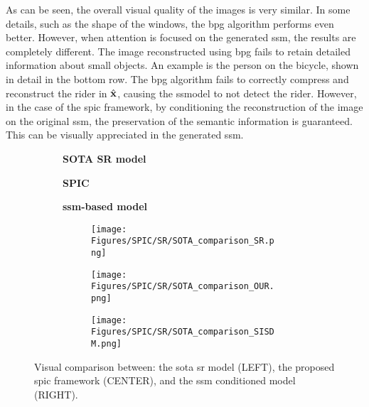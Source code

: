As can be seen, the overall visual quality of the images is very similar. In some details, such as the shape of the windows, the \gls{bpg} algorithm performs even better. However, when attention is focused on the generated \gls{ssm}, the results are completely different. The image reconstructed using \gls{bpg} fails to retain detailed information about small objects. An example is the person on the bicycle, shown in detail in the bottom row. The \gls{bpg} algorithm fails to correctly compress and reconstruct the rider in $\hat{\mathbf{x}}$, causing the \gls{ssmodel} to not detect the rider. However, in the case of the \gls{spic} framework, by conditioning the reconstruction of the image on the original \gls{ssm}, the preservation of the semantic information is guaranteed. This can be visually appreciated in the generated \gls{ssm}.
\begin{figure}[!t]
    \centering
    \begin{subfigure}{\textwidth}
        \centering
        \begin{minipage}{0.333\textwidth}
            \centering
            \textbf{SOTA SR model} \cite{Rombach2022SR_CVPR}
        \end{minipage}%
        \begin{minipage}{0.333\textwidth}
            \centering
            \textbf{SPIC}
        \end{minipage}%
        \begin{minipage}{0.333\textwidth}
            \centering
            \textbf{\gls{ssm}-based model} \cite{Wang2022SISDM}
        \end{minipage}
    \end{subfigure}
    
    \begin{subfigure}{\textwidth}
        \centering
        \begin{subfigure}{0.333\textwidth}
            \centering
            \texttt{[image: Figures/SPIC/SR/SOTA\_comparison\_SR.png]}
            \caption*{}
        \end{subfigure}%
        \begin{subfigure}{0.333\textwidth}
            \centering
            \texttt{[image: Figures/SPIC/SR/SOTA\_comparison\_OUR.png]}
            \caption*{}
        \end{subfigure}%
        \begin{subfigure}{0.333\textwidth}
            \centering
            \texttt{[image: Figures/SPIC/SR/SOTA\_comparison\_SISDM.png]}
            \caption*{}
        \end{subfigure}
    \end{subfigure}
    \vspace{-1cm}
    \caption[Visual comparison with Super-Resolution and SSM conditioned models]{Visual comparison between: the \acrshort{sota} \acrshort{sr} model \cite{Rombach2022SR_CVPR} (LEFT), the proposed \acrshort{spic} framework (CENTER), and the \acrshort{ssm} conditioned model \cite{Wang2022SISDM} (RIGHT).}
    \label{fig: SPIC super_res_comparison}
\end{figure}

